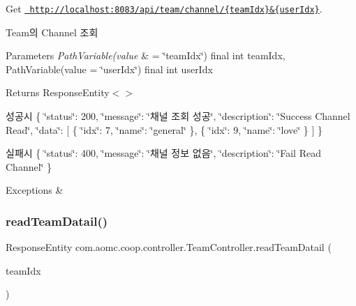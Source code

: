 Get \href{http://localhost:8083/api/team/channel/{teamIdx}&{userIdx}}{\texttt{ http\+://localhost\+:8083/api/team/channel/\{team\+Idx\}\&\{user\+Idx\}}}. 

Team의 Channel 조회


\begin{DoxyParams}{Parameters}
{\em Path\+Variable(value} & = \char`\"{}team\+Idx\char`\"{}) final int team\+Idx, Path\+Variable(value = \char`\"{}user\+Idx\char`\"{}) final int user\+Idx\\
\hline
\end{DoxyParams}
\begin{DoxyReturn}{Returns}
Response\+Entity$<$$>$
\end{DoxyReturn}
성공시 \{ \char`\"{}status\char`\"{}\+: 200, \char`\"{}message\char`\"{}\+: \char`\"{}채널 조회 성공\char`\"{}, \char`\"{}description\char`\"{}\+: \char`\"{}\+Success Channel Read\char`\"{}, \char`\"{}data\char`\"{}\+: \mbox{[} \{ \char`\"{}idx\char`\"{}\+: 7, \char`\"{}name\char`\"{}\+: \char`\"{}general\char`\"{} \}, \{ \char`\"{}idx\char`\"{}\+: 9, \char`\"{}name\char`\"{}\+: \char`\"{}love\char`\"{} \} \mbox{]} \}

실패시 \{ \char`\"{}status\char`\"{}\+: 400, \char`\"{}message\char`\"{}\+: \char`\"{}채널 정보 없음\char`\"{}, \char`\"{}description\char`\"{}\+: \char`\"{}\+Fail Read Channel\char`\"{} \}


\begin{DoxyExceptions}{Exceptions}
{\em } & \\
\hline
\end{DoxyExceptions}
\mbox{\label{classcom_1_1aomc_1_1coop_1_1controller_1_1_team_controller_a2ac70f1084366ec880a0419b791bbb26}} 
\subsubsection{\texorpdfstring{readTeamDatail()}{readTeamDatail()}}
{\footnotesize\ttfamily Response\+Entity com.\+aomc.\+coop.\+controller.\+Team\+Controller.\+read\+Team\+Datail (\begin{DoxyParamCaption}\item[{@Path\+Variable(value=\char`\"{}team\+Idx\char`\"{}) final int}]{team\+Idx }\end{DoxyParamCaption})}

